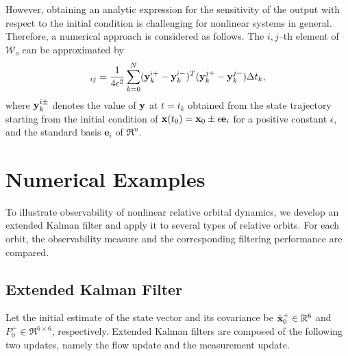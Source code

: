 However, obtaining an analytic expression for the sensitivity of the output with respect to the initial condition is challenging for nonlinear systems in general. Therefore, a numerical approach is considered as follows. The $i,j$--th element of $\mathcal{W}_o$ can be approximated by
\begin{align}
[\mathcal{W}]_{ij} = \frac{1}{4\epsilon^2}\sum_{k=0}^N (\y^{i+}_k-\y^{i-}_k)^T(\y^{j+}_k-\y^{j-}_k) \Delta t_k,
\end{align}
where $\mathbf{y}^{i\pm}_k$ denotes the value of $\mathbf{y}$ at $t=t_k$ obtained from the state trajectory starting from the initial condition of $\mathbf{x}(t_0)=\mathbf{x}_0\pm \epsilon \mathbf{e}_i $ for a positive constant $\epsilon$, and the standard basis $\mathbf{e}_i$ of $\Re^n$.  






\section{Numerical Examples}



To illustrate observability of nonlinear relative orbital dynamics, we develop an extended Kalman
filter and apply it to several types of relative orbits. For each orbit, the observability measure and the corresponding filtering performance are compared. 

\subsection{Extended Kalman Filter}

Let the initial estimate of the state vector and its covariance be $\hat {\mathbf{x}}_0^+\in\mathbb{R}^6$ and $P^+_0\in\Re^{6\times 6}$, respectively. Extended Kalman filters are composed of the following two updates, namely the flow update and the measurement update. 

